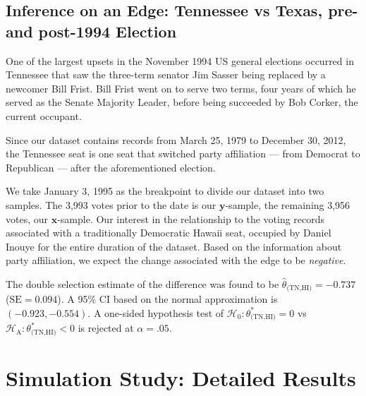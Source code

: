 \documentclass[11pt]{article}
\numberwithin{equation}{section}
\numberwithin{theorem}{section}
\def\fatx{\boldsymbol{x}}
\def\faty{\boldsymbol{y}}
\theoremstyle{definition}
\theoremstyle{remark}
\begin{document}
\subsection{Inference on an Edge: Tennessee vs Texas, pre- and post-1994 Election}

One of the largest upsets in the November 1994 US general elections occurred in Tennessee that saw the three-term senator Jim Sasser being replaced by a newcomer Bill Frist.
Bill Frist went on to serve two terms, four years of which he served as the Senate Majority Leader, before being succeeded by Bob Corker, the current occupant.

Since our dataset contains records from March 25, 1979 to December 30, 2012, the Tennessee seat is one seat that switched party affiliation --- from Democrat to Republican --- after the aforementioned election.

We take January 3, 1995 as the breakpoint to divide our dataset into two samples.
The 3,993 votes prior to the date is our $\faty$-sample, the remaining 3,956 votes, our $\fatx$-sample.
Our interest in the relationship to the voting records associated with a traditionally Democratic Hawaii seat, occupied by Daniel Inouye for the entire duration of the dataset.
Based on the information about party affiliation, we expect the change associated with the edge to be {\it negative}.

The double selection estimate of the difference was found to be $\hat\theta_\text{(TN,HI)} = -0.737$ ($\text{SE} = 0.094$).
A 95\% CI based on the normal approximation is $(-0.923,-0.554)$.
A one-sided hypothesis test of $\mathcal{H}_0 : \theta_{\text{(TN,HI)}}^* = 0$ vs $\mathcal{H}_\text{A} : \theta_{\text{(TN,HI)}}^* < 0$ is rejected at $\alpha = .05$.

{


}

\newpage

\appendix

\section{Simulation Study: Detailed Results}
\end{document}
